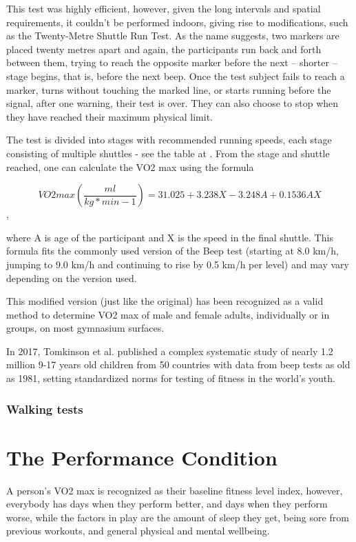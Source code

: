 This test was highly efficient, however, given the long intervals and spatial requirements, it couldn't be performed indoors, giving rise to modifications, such as the Twenty-Metre Shuttle Run Test.
As the name suggests, two markers are placed twenty metres apart and again, the participants run back and forth between them, trying to reach the opposite marker before the next -- shorter -- stage begins, that is, before the next beep.
Once the test subject fails to reach a marker, turns without touching the marked line, or starts running before the signal, after one warning, their test is over.
They can also choose to stop when they have reached their maximum physical limit.

The test is divided into stages with recommended running speeds, each stage consisting of multiple shuttles - see the table at \cite{beep-test-scoring-table}.
From the stage and shuttle reached, one can calculate the VO2 max using the formula

\[VO2max (\frac{ml}{kg*min-1}) = 31.025 + 3.238X - 3.248A + 0.1536AX\],

where A is age of the participant and X is the speed in the final shuttle.
This formula fits the commonly used version of the Beep test (starting at 8.0 km/h, jumping to 9.0 km/h and continuing to rise by 0.5 km/h per level) and may vary depending on the version used.\cite{beep-test-versions}\cite{beep-test-20m-valid}

This modified version (just like the original) has been recognized as a valid method to determine VO2 max of male and female adults, individually or in groups, on most gymnasium surfaces.\cite{beep-test-20m-valid}

In 2017, Tomkinson et al. published a complex systematic study of nearly 1.2 million 9-17 years old children from 50 countries with data from beep tests as old as 1981,
setting standardized norms for testing of fitness in the world's youth.\cite{beep-test-youth-large-study}


\subsubsection*{Walking tests}

\section{The Performance Condition}

A person's VO2 max is recognized as their baseline fitness level index, however, everybody has days when they perform better, and days when they perform worse, while the factors in play are the amount of sleep they get, being sore from previous workouts, and general physical and mental wellbeing.

